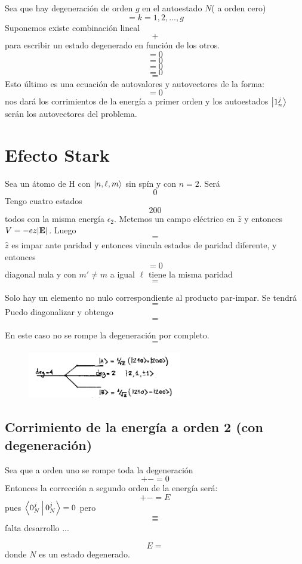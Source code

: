 \documentclass[10pt,oneside]{CBFT_book}
\begin{document}
Sea que hay degeneración de orden $g$ en el autoestado $N$( a orden cero)
\[
	= k=1,2,...,g
\]
Suponemos existe combinación lineal 
\[
	+
\]
para escribir un estado degenerado en función de los otros.
\[
	= 0
\]
\[
	= 0
\]
\[
	=0
\]
\[
	=0
\]
\[
	=
\]
Esto último es una ecuación de autovalores y autovectores de la forma:
\[
	= 0 
\]
nos dará los corrimientos de la energía a primer orden  y los autoestados $\Ket{1_n^j}$ serán los 
autovectores del problema.

\section{Efecto Stark}

Sea un átomo de H con $\Ket{n,\ell,m}$ sin spín y con $n=2$. Será 
\[
	0
\]
Tengo cuatro estados 
\[
	2 0 0 
\]
todos con la misma energía $\epsilon_2$.
Metemos un campo eléctrico en $\hat{z}$ y entonces $V=-ez|\vb{E}|$. Luego 
\[
	=
\]
$\hat{z}$ es impar ante paridad y entonces vincula estados de paridad diferente,
y entonces 
\[
	= 0 
\]
diagonal nula y con $m'\neq m$ a igual $\ell$ tiene la misma paridad
\[
	=
\]

Solo hay un elemento no nulo correspondiente al producto par-impar.
Se tendrá 
\[
	=
\]
Puedo diagonalizar y obtengo 
\[
	=
\]

En este caso no se rompe la degeneración por completo.
\[
	=
\]
\begin{figure}[htb]
	\begin{center}
	\includegraphics[width=0.6\textwidth]{images/teo2_20.pdf}
	\end{center}
	\caption{}
\end{figure} 

\subsection{Corrimiento de la energía a orden 2 (con degeneración)}

Sea que a orden uno se rompe toda la degeneración 
\[
	+ - = 0
\]
Entonces la corrección a segundo orden de la energía será:
\[
	+ - = E
\]
pues $\Braket{0_N^j|0_N^j}= 0$ pero 
\[
	=
\]
\[
	=
\]
falta desarrollo ...

\[
	E =
\]
donde $N$ es un estado degenerado.
\end{document}
